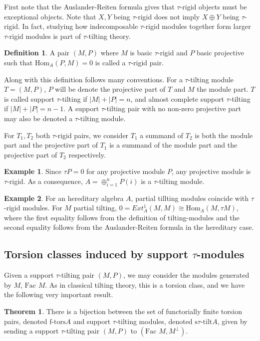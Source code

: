 \documentclass[]{article}
\theoremstyle{definition}
\newtheorem{definition}{Definition}[section]
\newtheorem{theorem}{Theorem}[section]
\newtheorem{example}{Example}[section]
\newcommand{\Hom}{\ensuremath{\text{Hom}}}
\newcommand{\tu}{\ensuremath{\tau}}
\newcommand{\Fac}{\ensuremath{\text{Fac }}}
\begin{document}
First note that the Auslander-Reiten formula gives that \tu-rigid objects must be exceptional objects. Note that $X,Y$ being $\tau$-rigid does not imply $X \oplus Y$ being $\tau$-rigid. In fact, studying how indecomposable $\tau$-rigid modules together form larger $\tau$-rigid modules is part of $\tau$-tilting theory.

\begin{definition}\cite[Definition 0.3]{tau}
	A pair $(M,P)$ where $M$ is basic $\tau$-rigid and $P$ basic projective such that $\Hom_A(P,M) = 0$ is called a  $\tau$-rigid pair.
\end{definition}

Along with this definition follows many conventions. For a  $\tau$-tilting module $T = (M,P)$, $P$ will be denote the projective part of $T$ and $M$ the module part. $T$ is called support \tu-tilting if $|M| + |P| = n$, and almost complete support \tu-tilting if $|M| + |P| = n - 1$. A support \tu-tilting pair with no non-zero projective part may also be denoted a \tu-tilting module. 

For $T_1,T_2$ both \tu-rigid pairs, we consider $T_1$ a summand of $T_2$ is both the module part and the projective part of $T_1$ is a summand of the module part and the projective part of $T_2$ respectively.

\begin{example}
	Since $\tu P = 0$ for any projective module $P$, any projective module is \tu-rigid. As a consequence, $A = \oplus_{i = 1}^n P(i)$ is a \tu-tilting module.	
\end{example}

\begin{example}
	For an hereditary algebra $A$, partial tillting modules coincide with \tu-rigid modules. For $M$ partial tilting, $0 = Ext^1_A(M,M) \cong \Hom_A(M,\tu M)$, where the first equality follows from the definition of tilting-modules and the second equality follows from the Auslander-Reiten formula in the hereditary case.
\end{example}

\subsection{Torsion classes induced by support \tu-modules}
Given a support \tu-tilting pair $(M,P)$, we may consider the modules generated by $M$, $\Fac M$. As in classical tilting theory, this is a torsion class, and we have the following very important result.

\begin{theorem}\cite[Theorem 2.7]{tau}\cite{auslandersmalo81}
	There is a bijection between the set of functorially finite torsion pairs, denoted $\text{f-tors} A$ and support \tu-tilting modules, denoted $\text{s}\tu\text{-tilt} A$, given by sending a support \tu-tilting pair $(M,P)$ to $(\Fac M,M^\perp)$.
\end{theorem}
\end{document}
